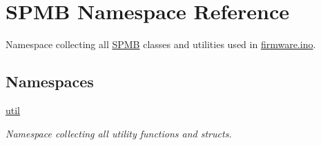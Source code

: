 \hypertarget{namespaceSPMB}{}\section{S\+P\+MB Namespace Reference}
\label{namespaceSPMB}


Namespace collecting all \hyperlink{namespaceSPMB}{S\+P\+MB} classes and utilities used in \hyperlink{firmware_8ino_source}{firmware.\+ino}.  


\subsection*{Namespaces}
\begin{DoxyCompactItemize}
\item 
 \hyperlink{namespaceSPMB_1_1util}{util}
\begin{DoxyCompactList}\small\item\em Namespace collecting all utility functions and structs. \end{DoxyCompactList}\end{DoxyCompactItemize}
